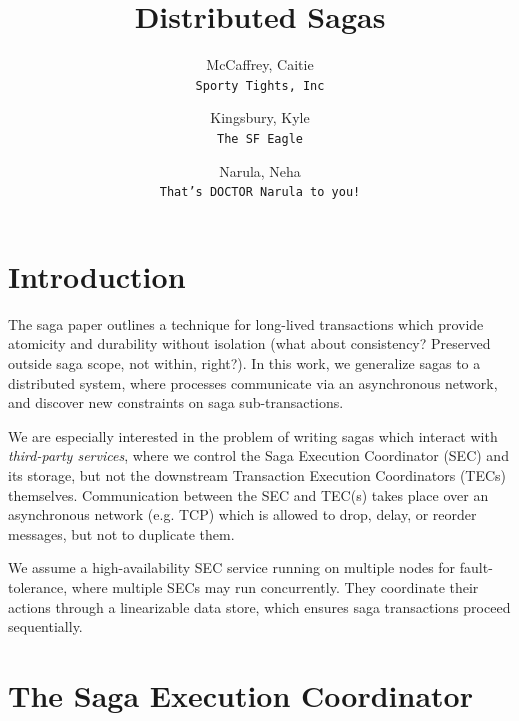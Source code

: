 \documentclass{article}
\author{
  McCaffrey, Caitie\\
  \texttt{Sporty Tights, Inc}
  \and
  Kingsbury, Kyle\\
  \texttt{The SF Eagle}
  \and
  Narula, Neha\\
  \texttt{That's DOCTOR Narula to you!}
}
\title{Distributed Sagas}
\begin{document}
\maketitle

\section{Introduction}

The saga paper outlines a technique for long-lived transactions which provide
atomicity and durability without isolation (what about consistency? Preserved
outside saga scope, not within, right?). In this work, we generalize sagas to
a distributed system, where processes communicate via an asynchronous network,
and discover new constraints on saga sub-transactions.

We are especially interested in the problem of writing sagas which interact with
\textit{third-party services}, where we control the Saga Execution Coordinator
(SEC) and its storage, but not the downstream Transaction Execution
Coordinators (TECs) themselves. Communication between the SEC and TEC(s) takes
place over an asynchronous network (e.g. TCP) which is allowed to drop, delay,
or reorder messages, but not to duplicate them.

We assume a high-availability SEC service running on multiple nodes for
fault-tolerance, where multiple SECs may run concurrently. They coordinate
their actions through a linearizable data store, which ensures saga
transactions proceed sequentially.

\section{The Saga Execution Coordinator}
\end{document}
